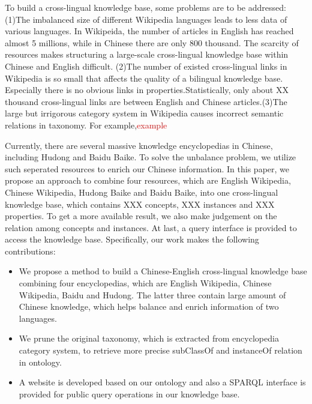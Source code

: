 \documentclass[runningheads,a4paper]{llncs}
\begin{document}
To build a cross-lingual knowledge base, some problems are to be addressed:(1)The imbalanced size of different Wikipedia languages leads to less data of various languages. In Wikipeida, the number of articles in English has reached almost 5 millions, while in Chinese there are only 800 thousand. The scarcity of resources makes structuring a large-scale cross-lingual knowledge base within Chinese and English difficult. (2)The number of existed cross-lingual links in Wikipedia is so small that affects the quality of a bilingual knowledge base. Especially there is no obvious links in properties.Statistically, only about XX thousand cross-lingual links are between English and Chinese articles.(3)The large but irrigorous category system in Wikipedia causes incorrect semantic relations in taxonomy. For example,\textcolor{red}{example}



Currently, there are several massive knowledge encyclopedias in Chinese, including Hudong and Baidu Baike. To solve the unbalance problem, we utilize such seperated resources to enrich our Chinese information. In this paper, we propose an approach to combine four resources, which are English Wikipedia, Chinese Wikipedia, Hudong Baike and Baidu Baike, into one cross-lingual knowledge base, which contains XXX concepts, XXX instances and XXX properties. To get a more available result, we also make judgement on the relation among concepts and instances. At last, a query interface is provided to access the knowledge base. Specifically, our work makes the following contributions:
\begin{itemize}
  \item We propose a method to build a Chinese-English cross-lingual knowledge base combining four encyclopedias, which are English Wikipedia, Chinese Wikipedia, Baidu and Hudong. The latter three contain large amount of Chinese knowledge, which helps balance and enrich information of two languages.
  \item We prune the original taxonomy, which is extracted from encyclopedia category system, to retrieve more precise subClassOf and instanceOf relation in ontology.
  \item A website is developed based on our ontology and also a SPARQL interface is provided for public query operations in our knowledge base.
\end{itemize}
\end{document}
